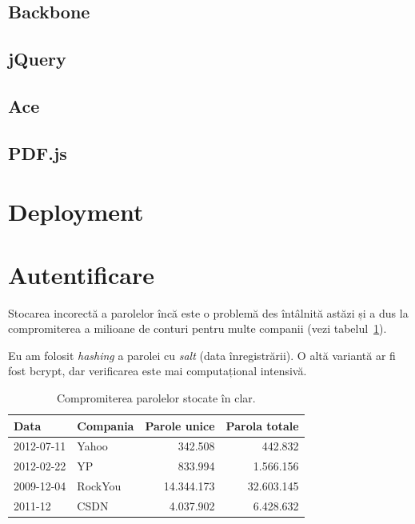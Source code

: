 \documentclass[a4wide,12pt]{report}
\newcommand{\eng}[1]{\emph{#1}} %
\begin{document}
\subsection{Backbone}

\subsection{jQuery}

\subsection{Ace}

\subsection{PDF.js}

\section{Deployment}

\section{Autentificare}

Stocarea incorectă a parolelor încă este o problemă des întâlnită astăzi și a
dus la compromiterea a milioane de conturi pentru multe companii (vezi
tabelul~\ref{parole}).

Eu am folosit \eng{hashing} a parolei cu \eng{salt} (data înregistrării). O altă
variantă ar fi fost bcrypt, dar verificarea este mai computațional intensivă.

\begin{table}[hb]
\begin{center}
\begin{tabular}{l l r r}
Data & Compania & Parole unice & Parola totale \\
\hline
2012-07-11 & Yahoo & 342.508 & 442.832 \\
2012-02-22 & YP & 833.994 & 1.566.156 \\
2009-12-04 & RockYou & 14.344.173 & 32.603.145 \\
2011-12 & CSDN & 4.037.902 & 6.428.632 \\
\end{tabular}
\end{center}
\caption{Compromiterea parolelor stocate în clar\cite{passleak}.}
\label{parole}
\end{table}
\end{document}
